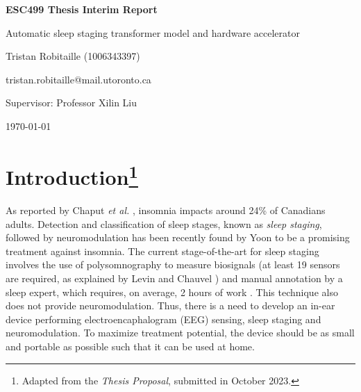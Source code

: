 \documentclass[12pt]{article}
\begin{document}
    \begin{titlepage}
        \centering
        {\LARGE\bfseries ESC499 Thesis Interim Report\par}
        {\Large Automatic sleep staging transformer model and hardware accelerator\par}
        \vspace*{\fill}
        \vspace{1cm}
        {\Large Tristan Robitaille (1006343397)\par}
        {\large tristan.robitaille@mail.utoronto.ca\par}
        \vspace{1cm}
        {\large Supervisor: Professor Xilin Liu\par}
        \vfill
        {\large \today\par}
        \thispagestyle{empty}
    \end{titlepage}

    \newpage
    \doublespacing %

    \pagestyle{fancy}
    \fancyhf{}
    \renewcommand{\headrulewidth}{0pt} %
    \rfoot{\thepage} %

    \tableofcontents
    \newpage

    \listoffigures

    \listoftables
    \newpage


    \section[Introduction]{Introduction\footnote{Adapted from the \textit{Thesis Proposal}, submitted in October 2023.}}
    As reported by Chaput \textit{et al.} \cite{insomnia_prevalence}, insomnia impacts around 24\% of Canadians adults. Detection and classification of sleep stages, known as \textit{sleep staging}, followed by neuromodulation has been recently found by Yoon \cite{yoon2021neuromodulation} to be a promising
    treatment against insomnia. The current stage-of-the-art for sleep staging involves the use of polysomnography to measure biosignals (at least 19 sensors are required, as explained by Levin and Chauvel \cite{RUNDO2019381}) and manual annotation by a sleep expert, which requires, on average, 2 hours of work \cite{phan2022automatic}.
    This technique also does not provide neuromodulation. Thus, there is a need to develop an in-ear device performing electroencaphalogram (EEG) sensing, sleep staging and neuromodulation. To maximize treatment potential, the device should be as small and portable as possible such that it can be used at home.
\end{document}
